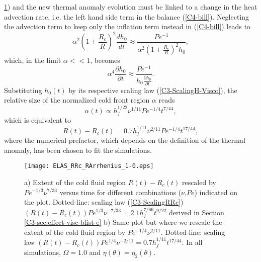 \ref{C4-ELAS_RRc_RArrhenius_1-0})   and   the  new   thermal   anomaly
evolution must be linked to a  change in the heat advection rate, i.e.
the left  hand side term  in the balance  (\ref{C4-bill}).  Neglecting
the  advection  term  to  keep  only the  inflation  term  instead  in
(\ref{C4-bill}) leads to
\begin{equation}
  \alpha^2\left(1+\frac{R_c}{R}\right)^2\frac{d h_0}{d
    t}\approx \frac{Pe^{-1}}{\alpha^2\left(1+\frac{R_c}{R}\right)^2h_0},
\end{equation}
which, in the limit $\alpha<<1$, becomes
\begin{equation}
  \alpha^4\frac{\partial h_0}{\partial
    t} \approx \frac{Pe^{-1}}{h_0\frac{\partial h_0}{\partial t}}.
\end{equation}
Substituting    $h_0(t)$    by     its    respective    scaling    law
(\ref{C3-ScalingH-Visco}), the  relative size  of the  normalized cold
front region $\alpha$ reads
\begin{equation}
  \alpha(t) \propto h_f^{1/22}\nu^{1/11}Pe^{-1/4}t^{7/44},
\end{equation}
which is equivalent to
\begin{equation}
  R(t)-R_c(t) = 0.7h_f^{1/11}\nu^{2/11}Pe^{-1/4}t^{17/44},
  \label{C4-ScalingRRc-Heating}
\end{equation}
where the numerical prefactor, which  depends on the definition of the
thermal anomaly, has been chosen to fit the simulations.

\begin{figure}[h!]
  \begin{center}
    \graphicspath{ {/Users/thorey/Documents/These/Projet/Refroidissement/Skin_Model/Figure/Figure_Heating/} }
    \texttt{[image: ELAS\_RRc\_RArrhenius\_1-0.eps]}
    \caption{a) Extent of the cold fluid region $R(t)-R_c(t)$ rescaled
      by $Pe^{-1/3}\nu^{7/33}$ versus  time for different combinations
      ($\nu$,$Pe$) indicated  on the  plot.  Dotted-line:  scaling law
      (\ref{C3-ScalingRRc})
      $(R(t)-R_c(t))Pe^{1/3}\nu^{-7/33}=    2.1    h_f^{7/66}t^{9/22}$
      derived in Section \ref{C3-sec:effect-visc-blist-e} b) Same plot
      but where  we rescale  the extent  of the  cold fluid  region by
      $Pe^{-1/4}\nu^{2/11}$.       Dotted-line:       scaling      law
      $(R(t)-R_c(t))Pe^{1/4}\nu^{-2/11}= 0.7  h_f^{1/11}t^{17/44}$. In
      all           simulations,            $\Omega=1.0$           and
      $\eta(\theta)=\eta_2(\theta)$.}
    \label{C4-ELAS_RRc_RArrhenius_1-0}
  \end{center}
\end{figure}

